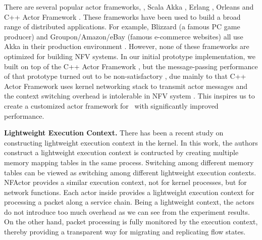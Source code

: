 
There are several popular actor frameworks, \eg, Scala Akka \cite{akka}, Erlang \cite{erlang}, Orleans \cite{Orleans} and C++ Actor Framework \cite{caf}. These frameworks have been used to build a broad range of distributed applications. %
 For example, Blizzard (a famous PC game producer) and Groupon/Amazon/eBay (famous e-commerce websites) all use Akka in their production environment \cite{akka}. However, none of these frameworks are optimized for building NFV systems. In our initial prototype implementation, we built \nfactor on top of the C++ Actor Framework \cite{caf}, but the message-passing performance of that prototype turned out to be non-satisfactory %
 , due mainly to \ac{that C++ Actor Framework uses kernel networking stack to transmit actor messages and the context switching overhead is intolerable in NFV system} \cite{martins2014clickos}. This inspires us to create a customized actor framework for \nfactor~with  significantly improved performance.

\textbf{Lightweight Execution Context.}
There has been a recent study on constructing lightweight execution context \cite{litton2016light} in the kernel. In this work, the authors construct a lightweight execution context is contructed by creating multiple memory mapping tables in the same process. Switching among different memory tables can be viewed as switching among different lightweight execution contexts. NFActor provides a similar execution context, not for kernel processes, but for network functions. Each actor inside \nfactor provides a lightweight execution context for processing a packet along a service chain. Being a lightweight context, the actors do not introduce too much overhead as we can see from the experiment results. On the other hand, packet processing is fully monitored by the execution context, thereby providing a transparent way for migrating and replicating flow states.
